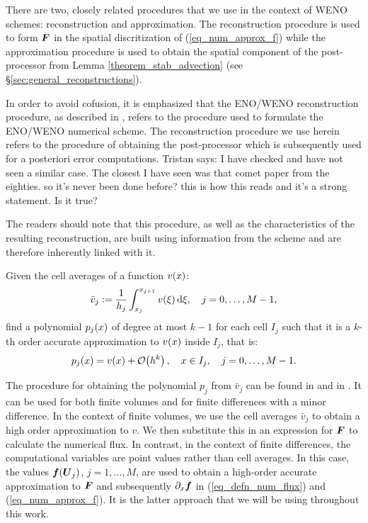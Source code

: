\documentclass[final]{amsart}
\renewcommand{\vec}[1]{\geovec{#1}}
\newcommand{\tristan}[1]{{\color{purple} Tristan says:  #1 }}
\numberwithin{equation}{section}
\begin{document}
There are two, closely related procedures that we use in the context
of WENO schemes: reconstruction and approximation. The reconstruction
procedure is used to form $\vec{F}$ in the spatial discritization of
(\ref{eq_num_approx_f}) while the approximation procedure is used to
obtain the spatial component of the post-processor from Lemma
\ref{theorem_stab_advection} (see
\S\ref{sec:general_reconstructions}).


\begin{Rem}
  In order to avoid cofusion, it is emphasized that the ENO/WENO
  reconstruction procedure, as described in \cite{shu1998essentially},
  refers to the procedure used to formulate the ENO/WENO numerical
  scheme.  The reconstruction procedure we use herein refers to the procedure of obtaining the post-processor which is
  subsequently used for a posteriori error computations. \tristan{I have checked and have not seen a similar case.  The closest I have seen was that comet paper  from the eighties. so
    it's never been done before? this is how this reads and it's a
    strong statement. Is it true?}
	
  The readers should note that this procedure, as well as the
  characteristics of the resulting reconstruction, are built using
  information from the scheme and are therefore inherently linked with
  it.
\end{Rem}


\begin{Defn}
  Given the cell averages of a function $v\!\left({x}\right)$:
  \begin{equation}
    \bar{v}_j:= \frac{1}{h_j}\int_{x_j}^{x_{j+1}} v\!\left({\xi}\right)\mathrm{d}\xi, \quad j=0,\dots,M-1,
  \end{equation}
  find a polynomial $p_j\!\left({x}\right)$ of degree at most $k-1$ for each
  cell $I_j$ such that it is a $k$-th order accurate
  approximation to $v\!\left({x}\right)$ inside $I_j$, that is:
  \begin{equation}
    p_j\!\left({x}\right) = v\!\left({x}\right) + \mathcal{O}\!\left({h^k}\right), \quad x\in I_j, \quad j=0,\dots,M-1.
  \end{equation}
\end{Defn}
The procedure for obtaining the polynomial $p_j$ from $\bar{v}_j$ can
be found in \cite[Procedure 2.2]{shu1998essentially} and in \cite[\S
  2.2]{shu2020essentially}.  It can be used for both finite volumes
and for finite differences with a minor difference.  In the context of
finite volumes, we use the cell averages $\bar{v}_j$ to obtain a high
order approximation to $v$.  We then substitute this in an expression
for $\vec{F}$ to calculate the numerical flux. In contrast, in the
context of finite differences, the computational variables are point
values rather than cell averages. In this case, the values
$\vec{f}\qp{\vec{U}_j}$, $j=1,\dots,M$, are used to obtain a
high-order accurate approximation to $\vec{F}$ and subsequently
$\partial_x\vec{f}$ in (\ref{eq_defn_num_flux}) and
(\ref{eq_num_approx_f}).  It is the latter approach that we will be
using throughout this work.
\end{document}
